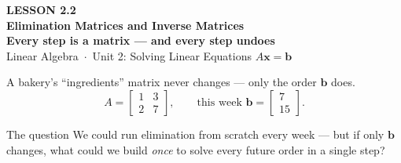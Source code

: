 \documentclass[aspectratio=169, 11pt]{beamer}
\newcommand{\xx}{\mathbf{x}}
\newcommand{\bb}{\mathbf{b}}
\begin{document}
{
\begin{frame}[plain]
  \vspace{2.8cm}\hspace{0.55cm}%
  \begin{minipage}{0.9\textwidth}
    {\color{goldacc}\bfseries\small LESSON 2.2}\\[0.5cm]
    {\color{white}\bfseries\LARGE Elimination Matrices and Inverse Matrices}\\[0.3cm]
    {\color{white}\bfseries\large Every step is a matrix --- and every step undoes}\\[1.0cm]
    {\color{blushmid}\small Linear Algebra~$\cdot$~Unit 2: Solving Linear Equations $A\xx=\bb$}
  \end{minipage}
\end{frame}
}

\begin{frame}[t, plain]
  A bakery's ``ingredients'' matrix never changes --- only the order $\bb$ does.
  \[
    A = \begin{bmatrix} 1 & 3 \\ 2 & 7 \end{bmatrix}, \qquad
    \text{this week } \bb = \begin{bmatrix} 7 \\ 15 \end{bmatrix}.
  \]
  \begin{block}{The question}
    We could run elimination from scratch every week --- but if only $\bb$ changes, what could we
    build \emph{once} to solve every future order in a single step?
  \end{block}
\end{frame}
\end{document}
